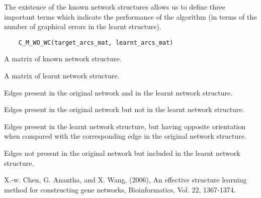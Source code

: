 \documentclass[letterpaper]{book}
\begin{document}
%
\begin{Description}\relax
The existence of the known network structures allows us to define three important terms which indicate the performance of the algorithm (in terms of the number of graphical errors in the learnt structure).
\end{Description}
%
\begin{Usage}
\begin{verbatim}
	C_M_WO_WC(target_arcs_mat, learnt_arcs_mat)
\end{verbatim}
\end{Usage}
%
\begin{Arguments}
\begin{ldescription}
\item[\code{target\_arcs\_mat}]  A matrix of known network structure. 
\item[\code{learnt\_arcs\_mat}]  A matrix of learnt network structure. 
\end{ldescription}
\end{Arguments}
%
\begin{Value}
\begin{ldescription}
\item[\code{C (Correct Arcs)}] Edges present in the original network and in the learnt network structure.
\item[\code{M (Missing Arcs)}] Edges present in the original network but not in the learnt network structure.
\item[\code{WO (Wrongly Oriented Arcs)}] Edges present in the learnt network structure, but having opposite orientation when compared with the corresponding edge in the original network structure.
\item[\code{WC (Wrongly Corrected Arcs)}] Edges not present in the original network but included in the learnt network structure.
\end{ldescription}
\end{Value}
%
\begin{References}\relax
X.-w. Chen, G. Anantha, and X. Wang, (2006), An effective structure learning method for constructing gene networks, Bioinformatics, Vol. 22, 1367-1374.
\end{References}
\end{document}
